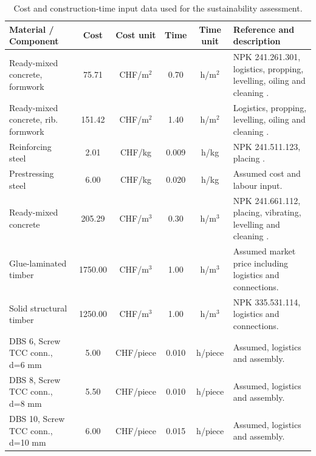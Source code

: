 \begin{table}[h]
    \centering
    \begingroup
    \scriptsize
    \caption{Cost and construction-time input data used for the sustainability assessment.}
    \label{tab:cost_time_assumptions}
    \setlength{\tabcolsep}{3pt}
    \renewcommand{\arraystretch}{1.12}
    \begin{tabularx}{\textwidth}{@{}X|c|c|c|c|X@{}}
    \hline
    \textbf{Material / Component} &
    \textbf{Cost} &
    \textbf{Cost unit} &
    \textbf{Time} &
    \textbf{Time unit} &
    \textbf{Reference and description} \\ \hline

    Ready-mixed concrete, formwork &
    75.71 & CHF/m$^2$ & 0.70 & h/m$^2$ &
    NPK 241.261.301, logistics, propping, levelling, oiling and cleaning \cite{CIB19076}.\\

    Ready-mixed concrete, rib. formwork &
    151.42 & CHF/m$^2$ & 1.40 & h/m$^2$ &
    Logistics, propping, levelling, oiling and cleaning \cite{Ammann2024}.\\

    Reinforcing steel &
    2.01 & CHF/kg & 0.009 & h/kg &
    NPK 241.511.123, placing \cite{CIB19076}.\\

    Prestressing steel &
    6.00 & CHF/kg & 0.020 & h/kg &
    Assumed cost and labour input. \\

    Ready-mixed concrete &
    205.29 & CHF/m$^3$ & 0.30 & h/m$^3$ &
    NPK 241.661.112, placing, vibrating, levelling and cleaning \cite{CIB19076}. \\

    Glue-laminated timber &
    1750.00 & CHF/m$^3$ & 1.00 & h/m$^3$ &
    Assumed market price including logistics and connections. \\

    Solid structural timber &
    1250.00 & CHF/m$^3$ & 1.00 & h/m$^3$ &
    NPK 335.531.114, logistics and connections. \\

    DBS 6, Screw TCC conn., d=6 mm &
    5.00 & CHF/piece & 0.010 & h/piece &
    Assumed, logistics and assembly. \\

    DBS 8, Screw TCC conn., d=8 mm &
    5.50 & CHF/piece & 0.010 & h/piece &
    Assumed, logistics and assembly. \\

    DBS 10, Screw TCC conn., d=10 mm &
    6.00 & CHF/piece & 0.015 & h/piece &
    Assumed, logistics and assembly. \\


\end{tabularx}
\end{table}
